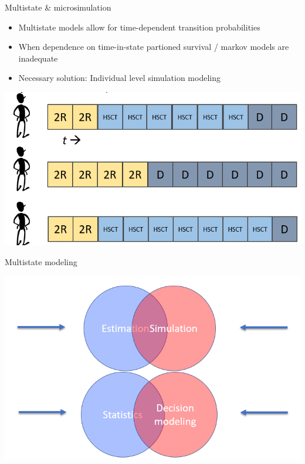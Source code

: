 \documentclass[
  ignorenonframetext,
]{beamer}
\providecommand{\tightlist}{%
  \setlength{\itemsep}{0pt}\setlength{\parskip}{0pt}}
\begin{document}
\begin{frame}{Multistate \& microsimulation}
\protect\hypertarget{multistate-microsimulation}{}

\begin{itemize}
\tightlist
\item
  Multistate models allow for time-dependent transition probabilities
\item
  When dependence on time-in-state partioned survival / markov models
  are inadequate\\
\item
  Necessary solution: Individual level simulation modeling
\end{itemize}

\includegraphics[width=1\linewidth]{figures/microsim}

\end{frame}

\begin{frame}{Multistate modeling}
\protect\hypertarget{multistate-modeling-5}{}

\includegraphics[width=1\linewidth]{figures/venn}

\end{frame}
\end{document}

